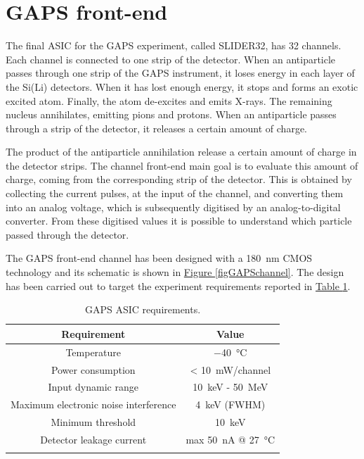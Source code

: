 \section{GAPS front-end}
\label{secGAPSfrontend}

The final ASIC for the GAPS experiment, called SLIDER32, has 32 channels. Each channel is connected to one strip of the detector. When an antiparticle passes through one strip of the GAPS instrument, it loses energy in each layer of the Si(Li) detectors. When it has lost enough energy, it stops and forms an exotic excited atom. Finally, the atom de-excites and emits X-rays. The remaining nucleus annihilates, emitting pions and protons. When an antiparticle passes through a strip of the detector, it releases a certain amount of charge. 

\par
The product of the antiparticle annihilation release a certain amount of charge in the detector strips. The channel front-end main goal is to evaluate this amount of charge, coming from the corresponding strip of the detector. This is obtained by collecting the current pulses, at the input of the channel, and converting them into an analog voltage, which is subsequently digitised by an analog-to-digital converter. From these digitised values it is possible to understand which particle passed through the detector. 

\par
The GAPS front-end channel has been designed with a \SI{180}{\nano\meter} CMOS technology and its schematic is shown in \hyperref[figGAPSchannel]{Figure \ref{figGAPSchannel}}. The design has been carried out to target the experiment requirements reported in \hyperref[tabGAPSrequirements]{Table \ref{tabGAPSrequirements}}.

\begin{table}[ht]
    \centering
    \begin{tabular}{c c} 
         \Xhline{2\arrayrulewidth}
         Requirement & Value \T\B \\
         \hline
         Temperature & \SI{-40}{\celsius} \T\B \\
         Power consumption & < \SI{10}{\milli\watt}/channel \T\B \\
         Input dynamic range & \SI{10}{\kilo\electronvolt} - \SI{50}{\mega\electronvolt} \T\B \\
         Maximum electronic noise interference & \SI{4}{\kilo\electronvolt} (FWHM) \T\B \\
         Minimum threshold & \SI{10}{\kilo\electronvolt} \T\B \\
         Detector leakage current & max \SI{50}{\nano\ampere} @ \SI{27}{\celsius} \T\B \\
         \Xhline{2\arrayrulewidth}
    \end{tabular}
    \caption{GAPS ASIC requirements.}
    \label{tabGAPSrequirements}
\end{table}


